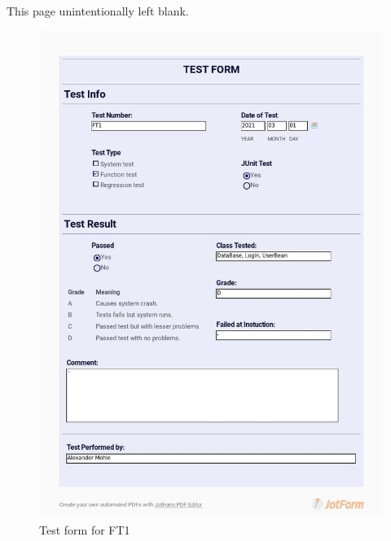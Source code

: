 \documentclass{article}
\begin{document}
\vspace*{\fill}
                \hfill
                \begin{center}
                This page unintentionally left blank.
                \end{center}
                \vspace{\fill}
                \thispagestyle{empty}

\begin{figure}
     \centering
     \includegraphics[width=13cm]{images/2021_03_01_Alexander_FT1_001}
     \renewcommand\figurename{Figure}
     \caption{Test form for FT1}
     \label{fig:my_label}
 \end{figure}
 
\end{document}

